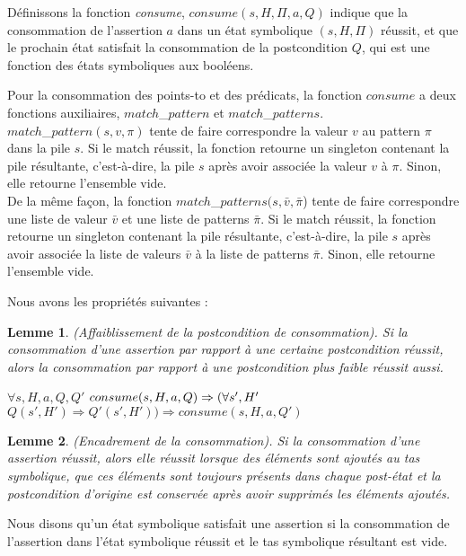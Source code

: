 \documentclass[11pt,openany]{article}
\newtheorem{lemme}{Lemme}
\begin{document}
	D\'efinissons la fonction \textit{consume}, $consume(s,H,\Pi,a,Q)$ indique que la consommation de l'assertion $a$ dans un \'etat symbolique $(s,H,\Pi)$ r\'eussit, et que le prochain \'etat satisfait la consommation de la postcondition $Q$, qui est une fonction des \'etats symboliques aux bool\'eens.
	
	Pour la consommation des points-to et des pr\'edicats, la fonction $consume$ a deux fonctions auxiliaires, $match$_$pattern$ et $match$_$patterns$.\\ $match$_$pattern(s,v,\pi)$ tente de faire correspondre la valeur $v$ au pattern $\pi$ dans la pile $s$. Si le match r\'eussit, la fonction retourne un singleton contenant la pile r\'esultante, c'est-\`a-dire, la pile $s$ apr\`es avoir associ\'ee la valeur $v$ \`a $\pi$. Sinon, elle retourne l'ensemble vide.\\
	De la m\^eme fa\c{c}on, la fonction $match$_$patterns(s,\bar{v},\bar{\pi}$) tente de faire correspondre une liste de valeur $\bar{v}$ et une liste de patterns $\bar{\pi}$. Si le match r\'eussit, la fonction retourne un singleton contenant la pile r\'esultante, c'est-\`a-dire, la pile $s$ apr\`es avoir associ\'ee la liste de valeurs $\bar{v}$ \`a la liste de patterns $\bar{\pi}$. Sinon, elle retourne l'ensemble vide.
	
	Nous avons les propri\'et\'es suivantes :	
	
	\begin{lemme}
		(Affaiblissement de la postcondition de consommation). Si la consommation d'une assertion par rapport \`a une certaine postcondition  r\'eussit, alors la consommation par rapport \`a une postcondition plus faible r\'eussit aussi.
		
$\forall s,H,a,Q,Q'$ $consume(s,H,a,Q)\Rightarrow\\(\forall s', H'$ $Q(s',H')\Rightarrow Q'(s',H'))\Rightarrow consume(s,H,a,Q')$
	\end{lemme}
	
	\begin{lemme}
		(Encadrement de la consommation). Si la consommation d'une assertion r\'eussit, alors elle r\'eussit lorsque des \'el\'ements sont ajout\'es au tas symbolique, que ces \'el\'ements sont toujours pr\'esents dans chaque post-\'etat et la postcondition d'origine est conserv\'ee apr\`es avoir supprim\'es les \'el\'ements ajout\'es.
	\end{lemme}
	Nous disons qu'un \'etat symbolique satisfait une assertion si la consommation de l'assertion dans l'\'etat symbolique r\'eussit et le tas symbolique r\'esultant est vide.\\
	
\end{document}
